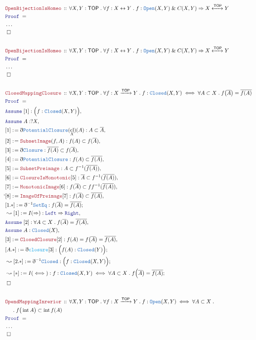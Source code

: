 \documentclass[12pt]{scrartcl}
\newcommand{\TYPE}[1]{\textcolor{NavyBlue}{\mathtt{#1}}}
\newcommand{\FUNC}[1]{\textcolor{Cerulean}{\mathtt{#1}}}
\newcommand{\LOGIC}[1]{\textcolor{Blue}{\mathtt{#1}}}
\newcommand{\THM}[1]{\textcolor{Maroon}{\mathtt{#1}}}
\renewcommand{\.}{\; . \;}
\newcommand{\de}{: \kern 0.1pc =}
\newcommand{\Theorem}[2]{& \THM{#1} \, :: \, #2 \\ & \Proof = \\ }
\newcommand{\NewLine}{\\ & \kern 1pc}
\newcommand{\Page}[1]{ \begin{align*} #1 \end{align*}   }
\newcommand{ \bd }{ \ByDef }
\newcommand{\NoProof}{ & \ldots \\ \EndProof}
\renewcommand{\And}{\; \& \;}
\newcommand{\Imply}{\Rightarrow}
\newcommand{\ToBij}{\leftrightarrow}
\newcommand{\ToIso}{\xleftrightarrow}
\newcommand{\Arrow}{\xrightarrow}
\newcommand{\Say}[3]{& #1 \de #2 : #3, \\}
\newcommand{\Conclude}[3]{& #1 \de #2 : #3; \\}
\newcommand{\Derive}[3]{& \leadsto #1 \de #2 : #3, \\}
\newcommand{\DeriveConclude}[3]{& \leadsto #1 \de #2 : #3 ; \\}
\newcommand{\Assume}[2]{& \LOGIC{Assume} \; #1 : #2, \\}
\newcommand{\QED}{\; \square}
\newcommand{\EndProof}{& \QED \\}
\newcommand{\ByDef}{\eth}
\newcommand{\Proof}{\LOGIC{Proof} \; }
\DeclareMathOperator*{\intx}{int}
\DeclareMathOperator*{\cl}{cl}
\newcommand{\TOP}{\mathsf{TOP}}
\begin{document}
\Page{
	\Theorem{OpenBijectionIsHomeo}
	{
		\forall X,Y : \TOP \.
		\forall f : X \ToBij Y \.
		f : \TYPE{Open}(X,Y) \And C(X,Y) 
		\Imply
		X \ToIso{\TOP} Y
	}
	\NoProof
	\\
	\Theorem{OpenBijectionIsHomeo}
	{
		\forall X,Y : \TOP \.
		\forall f : X \ToBij Y \.
		f : \TYPE{Open}(X,Y) \And C(X,Y) 
		\Imply
		X \ToIso{\TOP} Y
	}
	\NoProof
	\\
	\Theorem{ClosedMappingClosure}
	{
		\forall X,Y : \TOP \.
		\forall f : X \Arrow{\TOP} Y \. 
		f : \TYPE{Closed}(X,Y) \iff
		\forall A \subset X \. 
		f\big(\overline{A}\big) = \overline{f(A)}
	}
	\Assume{[1]}{\Big( f : \TYPE{Closed}(X,Y)  \Big)}
	\Assume{A}{?X}
	\Say{[1]}{\bd \TYPE{PotentialClosure}(\cl_X)(A)}{A \subset \overline{A}}
	\Say{[2]}{\THM{SubsetImage}(f,A)}{f(A) \subset f( \overline{A})}
	\Say{[3]}{\bd \TYPE{Closure}}{ \overline{f(A)} \subset f(\overline{A})  } 
	\Say{[4]}{\bd \TYPE{PotentialClosure} }{  f(A) \subset \overline{f(A)}  }
	\Say{[5]}{\THM{SubsetPreimage}}{A \subset f^{-1}(\overline{f(A)})}
	\Say{[6]}{\THM{ClosureIsMonotonic}[5]}{\overline{A} \subset f^{-1}(\overline{f(A)})} 
	\Say{[7]}{\THM{MonotonicImage}[6]}{f(\overline{A}) \subset ff^{-1}(\overline{f(A)})    }   
`	\Say{[8]}{\THM{ImageOfPreimage}[7]}{f(\overline{A}) \subset \overline{f(A)}}
	\Conclude{[1.*]}{ \bd^{-1} \TYPE{SetEq}}{ f(\overline{A}) = \overline{f(A)} }
	\Derive{[1]}{I(\Imply)}{ \LOGIC{Left} \Imply \LOGIC{Right}}
	\Assume{[2]}{\forall A \subset X \.  f(\overline{A}) = \overline{f(A)}}
	\Assume{A}{\TYPE{Closed}(X)}
	\Say{[3]}{\THM{ClosedClosure}[2]}{ f(A) = f\big(\overline{A}\big) = \overline{f(A)} }
	\Conclude{[A.*]}{\bd \FUNC{closure}[3]}{ \Big( f(A) : \TYPE{Closed}(Y) \Big)  } 
	\DeriveConclude{[2.*]}{\bd^{-1} \TYPE{Closed}}{\Big( f : \TYPE{Closed}(X,Y) \Big)}
	\DeriveConclude{[*]}{I(\iff)}
	{
		f : \TYPE{Closed}(X,Y) \iff
		\forall A \subset X \. 
		f\Big(\overline{A}\big) = \overline{f(A)}
	}
	\EndProof
	\\
	\Theorem{OpendMappingInrerior}
	{
		\forall X,Y : \TOP \.
		\forall f : X \Arrow{\TOP} Y \. 
		f : \TYPE{Open}(X,Y) \iff
		\forall A \subset X \. 
		\NewLine \. 
		f\big(\intx A\big) \subset \intx f(A)
	}
	\NoProof
}
\end{document}
